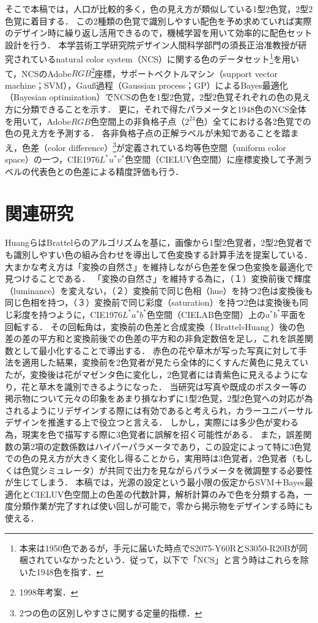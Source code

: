 \documentclass[uplatex,paper=a4,fontsize=4.0truemm,jafontsize=4.0truemm,head_space=30.0truemm,foot_space=30.0truemm,baselineskip=8.0truemm,line_length=40zw,gutter=25.0truemm,oneside,openany,fleqn,hanging_panctuation,open_bracket_pos=nibu_tentsuki,dvipdfmx,jis2004,book,titlepage]{jlreq}
\theoremstyle{mystyle}
\newcommand{\mathdisplaystyle}[1]{\(\displaystyle{#1}\)}
\begin{document}
			そこで本稿では，人口が比較的多く，色の見え方が類似している1型2色覚，2型2色覚に着目する．
			この2種類の色覚で識別しやすい配色を予め求めていれば実際のデザイン時に繰り返し活用できるので，機械学習を用いて効率的に配色セット設計を行う．
			本学芸術工学研究院デザイン人間科学部門の須長正治准教授が研究されているnatural color system（NCS）に関する色のデータセット\footnote{本来は1950色であるが，手元に届いた時点でS2075-Y60RとS3050-R20Bが同梱されていなかったという．従って，以下で「NCS」と言う時はこれらを除いた1948色を指す．}を用いて，NCSのAdobe\mathdisplaystyle{RGB}\footnote{1998年考案．}座標，サポートベクトルマシン（support vector machine；SVM），Gauß過程（Gaussian process；GP）によるBayes最適化（Bayesian optimization）でNCSの色を1型2色覚，2型2色覚それぞれの色の見え方に分類できることを示す．
			更に，それで得たパラメータと1948色のNCS全体を用いて，Adobe\mathdisplaystyle{RGB}色空間上の非負格子点（\mathdisplaystyle{2^{24}}色）全てにおける各2色覚での色の見え方を予測する．
			各非負格子点の正解ラベルが未知であることを踏まえ，色差（color difference）\footnote{2つの色の区別しやすさに関する定量的指標．}が定義されている均等色空間（uniform color space）の一つ，CIE1976\mathdisplaystyle{L^\ast u^\ast v^\ast}色空間（CIELUV色空間）\cite[p.~64]{Yaguchi2017b}に座標変換して予測ラベルの代表色との色差による精度評価も行う．
	\chapter{関連研究}
		HuangらはBrattelらのアルゴリズムを基に，画像から1型2色覚者，2型2色覚者でも識別しやすい色の組み合わせを導出して色変換する計算手法を提案している\cite{Huang2007}．
		大まかな考え方は「変換の自然さ」を維持しながら色差を保つ色変換を最適化で見つけることである．
		「変換の自然さ」を維持する為に，（１）変換前後で輝度（luminance）を変えない，（２）変換前で同じ色相（hue）を持つ2色は変換後も同じ色相を持つ，（３）変換前で同じ彩度（saturation）を持つ2色は変換後も同じ彩度を持つように，CIE1976\mathdisplaystyle{L^\ast a^\ast b^\ast}色空間（CIELAB色空間）上の\mathdisplaystyle{a^\ast b^\ast}平面を回転する．
		その回転角は，変換前の色差と合成変換（\mathdisplaystyle{\textrm{Brattel}\circ\textrm{Huang}}）後の色差の差の平方和と変換前後での色差の平方和の非負定数倍を足し，これを誤差関数として最小化することで導出する．
		赤色の花や草木が写った写真に対して手法を適用した結果，変換前を2色覚者が見たら全体的にくすんだ黄色に見えていたが，変換後は花がマゼンタ色に変化し，2色覚者には青紫色に見えるようになり，花と草木を識別できるようになった．
		当研究は写真や既成のポスター等の掲示物について元々の印象をあまり損なわずに1型2色覚，2型2色覚への対応が為されるようにリデザインする際には有効であると考えられ，カラーユニバーサルデザインを推進する上で役立つと言える．
		しかし，実際には多少色が変わる為，現実を色で描写する際に3色覚者に誤解を招く可能性がある．
		また，誤差関数の第2項の定数係数はハイパーパラメータであり，この設定によって特に3色覚での色の見え方が大きく変化し得ることから，実用時は3色覚者，2色覚者（もしくは色覚シミュレータ）が共同で出力を見ながらパラメータを微調整する必要性が生じてしまう．
		本稿では，光源の設定という最小限の仮定からSVM＋Bayes最適化とCIELUV色空間上の色差の代数計算，解析計算のみで色を分類する為，一度分類作業が完了すれば使い回しが可能で，零から掲示物をデザインする時にも使える．
\end{document}
